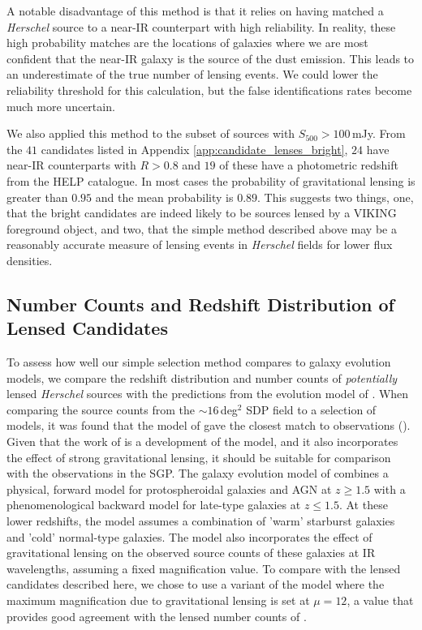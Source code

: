 A notable disadvantage of this method is that it relies on having matched a \textit{Herschel} source to a near-IR counterpart with high reliability. In reality, these high probability matches are the locations of galaxies where we are most confident that the near-IR galaxy is the source of the dust emission. This leads to an underestimate of the true number of lensing events. We could lower the reliability threshold for this calculation, but the false identifications rates become much more uncertain.

We also applied this method to the subset of sources with $S_{500} > 100\,$mJy. From the $41$ candidates listed in Appendix \ref{app:candidate_lenses_bright}, $24$ have near-IR counterparts with $R > 0.8$ and $19$ of these have a photometric redshift from the HELP catalogue. In most cases the probability of gravitational lensing is greater than $0.95$ and the mean probability is $0.89$. This suggests two things, one, that the bright candidates are indeed likely to be sources lensed by a VIKING foreground object, and two, that the simple method described above may be a reasonably accurate measure of lensing events in \textit{Herschel} fields for lower flux densities.

\subsection{Number Counts and Redshift Distribution of Lensed Candidates}

To assess how well our simple selection method compares to galaxy evolution models, we compare the redshift distribution and number counts of \textit{potentially} lensed \textit{Herschel} sources with the predictions from the evolution model of \citealt{Cai_2013}. When comparing the source counts from the $\sim 16\,$deg$^2$ SDP field to a selection of models, it was found that the model of \citealt{Negrello_2007} gave the closest match to observations (\citealt{Clements_2010}). Given that the work of \citealt{Cai_2013} is a development of the \citealt{Negrello_2007} model, and it also incorporates the effect of strong gravitational lensing, it should be suitable for comparison with the observations in the SGP. The galaxy evolution model of \citealt{Cai_2013} combines a physical, forward model for protospheroidal galaxies and AGN at $z \geq 1.5$ with a phenomenological backward model for late-type galaxies at $z \leq 1.5$. At these lower redshifts, the model assumes a combination of 'warm' starburst galaxies and 'cold' normal-type galaxies. The model also incorporates the effect of gravitational lensing on the observed source counts of these galaxies at IR wavelengths, assuming a fixed magnification value. To compare with the lensed candidates described here, we chose to use a variant of the \citealt{Cai_2013} model where the maximum magnification due to gravitational lensing is set at $\mu = 12$, a value that provides good agreement with the lensed number counts of \citealt{Negrello_2017}.

